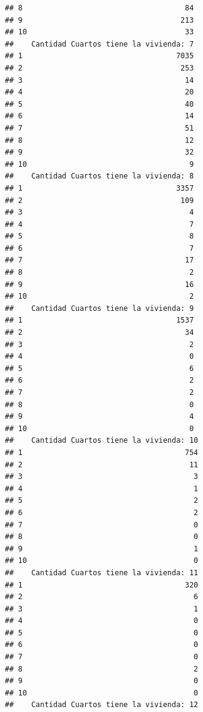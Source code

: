 \documentclass[11pt,]{article}
\begin{document}
\begin{verbatim}
## 8                                     84
## 9                                    213
## 10                                    33
##    Cantidad Cuartos tiene la vivienda: 7
## 1                                   7035
## 2                                    253
## 3                                     14
## 4                                     20
## 5                                     40
## 6                                     14
## 7                                     51
## 8                                     12
## 9                                     32
## 10                                     9
##    Cantidad Cuartos tiene la vivienda: 8
## 1                                   3357
## 2                                    109
## 3                                      4
## 4                                      7
## 5                                      8
## 6                                      7
## 7                                     17
## 8                                      2
## 9                                     16
## 10                                     2
##    Cantidad Cuartos tiene la vivienda: 9
## 1                                   1537
## 2                                     34
## 3                                      2
## 4                                      0
## 5                                      6
## 6                                      2
## 7                                      2
## 8                                      0
## 9                                      4
## 10                                     0
##    Cantidad Cuartos tiene la vivienda: 10
## 1                                     754
## 2                                      11
## 3                                       3
## 4                                       1
## 5                                       2
## 6                                       2
## 7                                       0
## 8                                       0
## 9                                       1
## 10                                      0
##    Cantidad Cuartos tiene la vivienda: 11
## 1                                     320
## 2                                       6
## 3                                       1
## 4                                       0
## 5                                       0
## 6                                       0
## 7                                       0
## 8                                       2
## 9                                       0
## 10                                      0
##    Cantidad Cuartos tiene la vivienda: 12

\end{verbatim}
\end{document}
